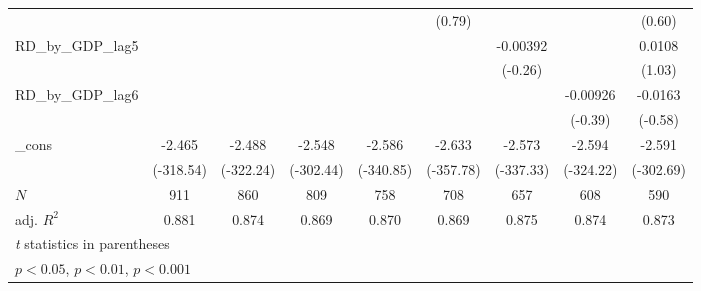 {\begin{tabular}{l*{8}{c}}
          &                  &                  &                  &                  &   (0.79)         &                  &                  &   (0.60)         \\
\addlinespace
RD\_by\_GDP\_lag5&                  &                  &                  &                  &                  & -0.00392         &                  &   0.0108         \\
          &                  &                  &                  &                  &                  &  (-0.26)         &                  &   (1.03)         \\
\addlinespace
RD\_by\_GDP\_lag6&                  &                  &                  &                  &                  &                  & -0.00926         &  -0.0163         \\
          &                  &                  &                  &                  &                  &                  &  (-0.39)         &  (-0.58)         \\
\addlinespace
\_cons    &   -2.465\sym{***}&   -2.488\sym{***}&   -2.548\sym{***}&   -2.586\sym{***}&   -2.633\sym{***}&   -2.573\sym{***}&   -2.594\sym{***}&   -2.591\sym{***}\\
          &(-318.54)         &(-322.24)         &(-302.44)         &(-340.85)         &(-357.78)         &(-337.33)         &(-324.22)         &(-302.69)         \\
\midrule
\(N\)     &      911         &      860         &      809         &      758         &      708         &      657         &      608         &      590         \\
adj. \(R^{2}\)&    0.881         &    0.874         &    0.869         &    0.870         &    0.869         &    0.875         &    0.874         &    0.873         \\
\bottomrule
\multicolumn{9}{l}{\footnotesize \textit{t} statistics in parentheses}\\
\multicolumn{9}{l}{\footnotesize \sym{*} \(p<0.05\), \sym{**} \(p<0.01\), \sym{***} \(p<0.001\)}\\
\end{tabular}
}
